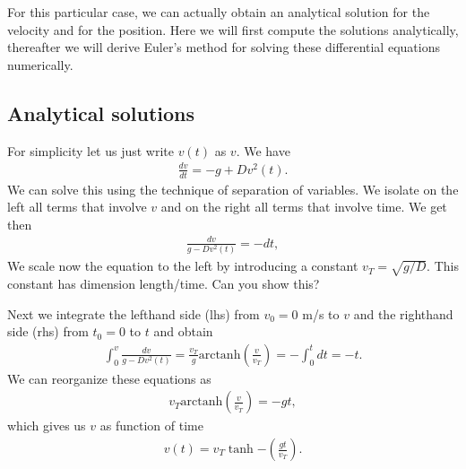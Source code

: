 \documentclass[letterpaper,10pt,english]{sphinxmanual}
\begin{document}
For this particular case, we can actually obtain an analytical
solution for the velocity and for the position. Here we will first
compute the solutions analytically, thereafter we will derive Euler’s
method for solving these differential equations numerically.


\subsection{Analytical solutions}
\label{\detokenize{chapter2:analytical-solutions}}
For simplicity let us just write \(v(t)\) as \(v\). We have
\begin{equation*}
\begin{split}
\frac{dv}{dt}= -g +Dv^2(t).
\end{split}
\end{equation*}
We can solve this using the technique of separation of variables. We
isolate on the left all terms that involve \(v\) and on the right all
terms that involve time. We get then
\begin{equation*}
\begin{split}
\frac{dv}{g -Dv^2(t) }= -dt,
\end{split}
\end{equation*}
We scale now the equation to the left by introducing a constant
\(v_T=\sqrt{g/D}\). This constant has dimension length/time. Can you
show this?

Next we integrate the left\sphinxhyphen{}hand side (lhs) from \(v_0=0\) m/s to \(v\) and
the right\sphinxhyphen{}hand side (rhs) from \(t_0=0\) to \(t\) and obtain
\begin{equation*}
\begin{split}
\int_{0}^v\frac{dv}{g -Dv^2(t) }= \frac{v_T}{g}\mathrm{arctanh}(\frac{v}{v_T})  =-\int_0^tdt = -t.
\end{split}
\end{equation*}
We can reorganize these equations as
\begin{equation*}
\begin{split}
v_T\mathrm{arctanh}(\frac{v}{v_T})  =-gt,
\end{split}
\end{equation*}
which gives us \(v\) as function of time
\begin{equation*}
\begin{split}
v(t)=v_T\tanh{-(\frac{gt}{v_T})}.
\end{split}
\end{equation*}
\end{document}
